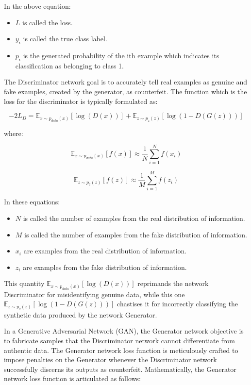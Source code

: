 \documentclass[12pt,a4paper]{report}
\begin{document}
In the above equation:
\begin{itemize}
  \item \( L \) is called the loss.
  \item \( y_{i} \) is called the true class label.
  \item \( p_{i} \) is the generated probability of the ith example which indicates its classification as belonging to class 1.
\end{itemize}

The Discriminator network goal is to accurately tell real examples as genuine and fake examples, created by the generator, as counterfeit. The function which is the loss for the discriminator is typically formulated as:

\begin{equation}
  -2L_D =  \mathbb{E}_{x \sim p_{data}(x)} [\log(D(x))] + \mathbb{E}_{z \sim p_z(z)} [\log(1 - D(G(z)))]
\end{equation}

where:

\begin{equation}
  \mathbb{E}_{x \sim p_{data}(x)} [f(x)] \approx \frac{1}{N} \sum_{i=1}^{N} f(x_i)
\end{equation}

\begin{equation}
  \mathbb{E}_{z \sim p_z(z)} [f(z)] \approx \frac{1}{M} \sum_{i=1}^{M} f(z_i)
\end{equation}

In these equations:
\begin{itemize}
  \item \( N \) is called the number of examples from the real distribution of information.
  \item \( M \) is called the number of examples from the fake distribution of information.
  \item \( x_i \) are examples from the real distribution of information.
  \item \( z_i \) are examples from the fake distribution of information.
\end{itemize}

This quantity $\mathbb{E}_{x \sim p_{data}(x)} [\log(D(x))]$ reprimands the network Discriminator for misidentifying genuine data, while this one $\mathbb{E}_{z \sim p_z(z)} [\log(1 - D(G(z)))]$ chastises it for incorrectly classifying the synthetic data produced by the network Generator.

In a Generative Adversarial Network (GAN), the Generator network objective is to fabricate samples that the Discriminator network cannot differentiate from authentic data. The Generator network loss function is meticulously crafted to impose penalties on the Generator whenever the Discriminator network successfully discerns its outputs as counterfeit. Mathematically, the Generator network loss function is articulated as follows:
\end{document}
